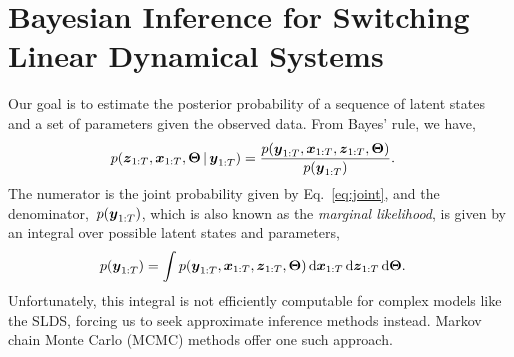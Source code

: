 \documentclass{article}
\begin{document}
\section{Bayesian Inference for Switching Linear Dynamical Systems}
\label{app:mcmc}
Our goal is to estimate the posterior probability of a sequence 
of latent states and a set of parameters given the observed data.
From Bayes' rule, we have,
\begin{align}
  p(\boldsymbol{z}_{1:T}, \boldsymbol{x}_{1:T}, \boldsymbol{\Theta} \,|\, \boldsymbol{y}_{1:T}) 
  &= 
  \frac{p(\boldsymbol{y}_{1:T}, \boldsymbol{x}_{1:T}, \boldsymbol{z}_{1:T}, \boldsymbol{\Theta})}{p(\boldsymbol{y}_{1:T})}.
\end{align}
The numerator is the joint probability given by Eq.~\eqref{eq:joint}, and
the denominator,~$p(\boldsymbol{y}_{1:T})$, which is also known as the
\emph{marginal likelihood}, is given by an integral over possible
latent states and parameters,
\begin{align}
  p(\boldsymbol{y}_{1:T}) &= \int p(\boldsymbol{y}_{1:T}, \boldsymbol{x}_{1:T}, \boldsymbol{z}_{1:T}, \boldsymbol{\Theta}) 
  \, \mathrm{d}\boldsymbol{x}_{1:T} \, \mathrm{d}\boldsymbol{z}_{1:T} \, \mathrm{d}\boldsymbol{\Theta}.
\end{align}
Unfortunately, this integral is not efficiently computable for complex
models like the SLDS, forcing us to seek approximate inference methods
instead. Markov chain Monte Carlo (MCMC) methods  offer one
such approach. 
\end{document}
